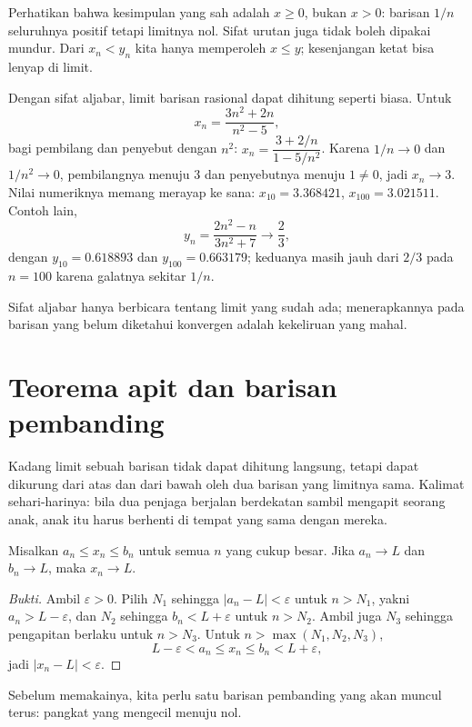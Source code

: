 Perhatikan bahwa kesimpulan yang sah adalah $x \ge 0$, bukan $x>0$: barisan
$1/n$ seluruhnya positif tetapi limitnya nol. Sifat urutan juga tidak boleh dipakai
mundur. Dari $x_n<y_n$ kita hanya memperoleh $x \le y$; kesenjangan ketat bisa
lenyap di limit.

Dengan sifat aljabar, limit barisan rasional dapat dihitung seperti biasa. Untuk
\[
x_n=\frac{3n^2+2n}{n^2-5},
\]
bagi pembilang dan penyebut dengan $n^2$:
$x_n=\dfrac{3+2/n}{1-5/n^2}$. Karena $1/n \to 0$ dan $1/n^2 \to 0$, pembilangnya
menuju $3$ dan penyebutnya menuju $1 \neq 0$, jadi $x_n \to 3$. Nilai numeriknya
memang merayap ke sana: $x_{10}=3.368421$, $x_{100}=3.021511$. Contoh lain,
\[
y_n=\frac{2n^2-n}{3n^2+7} \longrightarrow \frac{2}{3},
\]
dengan $y_{10}=0.618893$ dan $y_{100}=0.663179$; keduanya masih jauh dari $2/3$
pada $n=100$ karena galatnya sekitar $1/n$.

Sifat aljabar hanya berbicara tentang limit yang sudah ada; menerapkannya pada
barisan yang belum diketahui konvergen adalah kekeliruan yang mahal.

\section{Teorema apit dan barisan pembanding}

Kadang limit sebuah barisan tidak dapat dihitung langsung, tetapi dapat dikurung
dari atas dan dari bawah oleh dua barisan yang limitnya sama. Kalimat sehari-harinya:
bila dua penjaga berjalan berdekatan sambil mengapit seorang anak, anak itu harus
berhenti di tempat yang sama dengan mereka.

\begin{teorema}
Misalkan $a_n \le x_n \le b_n$ untuk semua $n$ yang cukup besar. Jika
$a_n \to L$ dan $b_n \to L$, maka $x_n \to L$.
\end{teorema}

\begin{proof}[Bukti]
Ambil $\varepsilon>0$. Pilih $N_1$ sehingga $|a_n-L|<\varepsilon$ untuk $n>N_1$,
yakni $a_n>L-\varepsilon$, dan $N_2$ sehingga $b_n<L+\varepsilon$ untuk $n>N_2$.
Ambil juga $N_3$ sehingga pengapitan berlaku untuk $n>N_3$. Untuk
$n>\max(N_1,N_2,N_3)$,
\[
L-\varepsilon < a_n \le x_n \le b_n < L+\varepsilon,
\]
jadi $|x_n-L|<\varepsilon$.
\end{proof}

Sebelum memakainya, kita perlu satu barisan pembanding yang akan muncul terus:
pangkat yang mengecil menuju nol.

